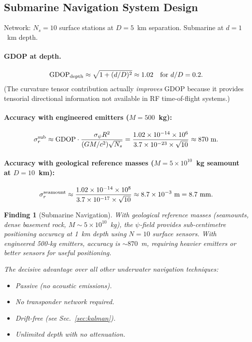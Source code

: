 \documentclass[aps,prd,twocolumn,superscriptaddress,nofootinbib]{revtex4-2}
\newtheorem{finding}{Finding}
\begin{document}
\subsection{Submarine Navigation System Design}

Network: $N_s = 10$ surface stations at $D = 5$~km separation.
Submarine at $d = 1$~km depth.

\paragraph{GDOP at depth.}
\begin{equation}
\mathrm{GDOP}_{\rm depth} \approx \sqrt{1 + (d/D)^2} \approx 1.02
\quad\text{for }d/D = 0.2.
\label{eq:gdop-depth}
\end{equation}
(The curvature tensor contribution actually \emph{improves} GDOP because
it provides tensorial directional information not available in RF
time-of-flight systems.)

\paragraph{Accuracy with engineered emitters ($M = 500$~kg):}
\begin{equation}
\sigma_{r}^{\rm sub} \approx \mathrm{GDOP}\cdot
\frac{\sigma_\psi R^2}{(GM/c^2)\sqrt{N_s}}
= \frac{1.02\times10^{-14}\times10^6}
{3.7\times10^{-23}\times\sqrt{10}}
\approx 870~\mathrm{m}.
\end{equation}

\paragraph{Accuracy with geological reference masses ($M = 5\times10^{10}$~kg
seamount at $D = 10$~km):}
\begin{equation}
\sigma_{r}^{\rm seamount} \approx \frac{1.02\times10^{-14}\times10^8}
{3.7\times10^{-17}\times\sqrt{10}}
\approx 8.7\times10^{-3}~\mathrm{m} = 8.7~\mathrm{mm}.
\label{eq:sub-accuracy}
\end{equation}

\begin{finding}[Submarine Navigation]
\label{find:submarine}
With geological reference masses (seamounts, dense basement rock,
$M \sim 5\times10^{10}$~kg), the $\psi$-field provides sub-centimetre
positioning accuracy at 1~km depth using $N=10$ surface sensors.
With engineered 500-kg emitters, accuracy is $\sim 870$~m, requiring
heavier emitters or better sensors for useful positioning.

The decisive advantage over all other underwater navigation techniques:
\begin{itemize}
\item Passive (no acoustic emissions).
\item No transponder network required.
\item Drift-free (see Sec.~\ref{sec:kalman}).
\item Unlimited depth with no attenuation.
\end{itemize}
\end{finding}
\end{document}
